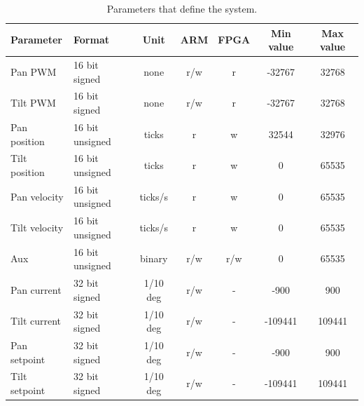 \begin{table}[htb]				
	\centering
	\begin{tabular}{llccccc}			
	Parameter & Format & Unit & ARM & FPGA & Min value & Max value\\		
	\midrule										
Pan PWM  &16 bit signed & none & r/w & r & -32767 &  32768  \\
Tilt PWM  & 16 bit signed  & none&r/w & r & -32767 &  32768 \\
Pan position & 16 bit unsigned&ticks & r & w & 32544 & 32976 \\
Tilt position & 16 bit unsigned&ticks & r & w & 0 & 65535 \\
Pan velocity  & 16 bit unsigned&ticks/s & r & w & 0 & 65535 \\
Tilt velocity  & 16 bit unsigned & ticks/s&r & w & 0 & 65535 \\
Aux  & 16 bit unsigned &binary& r/w & r/w & 0 & 65535 \\
Pan current & 32 bit signed & 1/10 deg & r/w & - & -900 & 900 \\
Tilt current  & 32 bit signed & 1/10 deg & r/w & - & -109441 & 109441 \\
Pan setpoint  & 32 bit signed & 1/10 deg & r/w & - & -900 & 900 \\
Tilt setpoint  & 32 bit signed & 1/10 deg & r/w & - & -109441 & 109441 \\
	\end{tabular}
	\caption{Parameters that define the system.}				
	\label{tab:parameters}			
\end{table}


